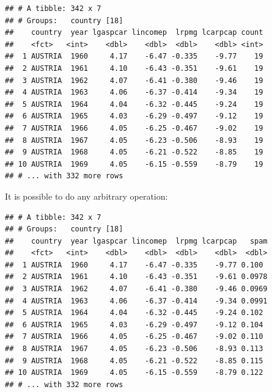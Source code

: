 \documentclass[]{gitbook}
\newenvironment{Shaded}{\begin{snugshade}}{\end{snugshade}}
\newcommand{\DataTypeTok}[1]{\textcolor[rgb]{0.13,0.29,0.53}{#1}}
\newcommand{\KeywordTok}[1]{\textcolor[rgb]{0.13,0.29,0.53}{\textbf{#1}}}
\newcommand{\NormalTok}[1]{#1}
\newcommand{\OperatorTok}[1]{\textcolor[rgb]{0.81,0.36,0.00}{\textbf{#1}}}
\newcommand{\StringTok}[1]{\textcolor[rgb]{0.31,0.60,0.02}{#1}}
\begin{document}
\begin{Shaded}
\end{Shaded}

\begin{verbatim}
## # A tibble: 342 x 7
## # Groups:   country [18]
##    country  year lgaspcar lincomep  lrpmg lcarpcap count
##    <fct>   <int>    <dbl>    <dbl>  <dbl>    <dbl> <int>
##  1 AUSTRIA  1960     4.17    -6.47 -0.335    -9.77    19
##  2 AUSTRIA  1961     4.10    -6.43 -0.351    -9.61    19
##  3 AUSTRIA  1962     4.07    -6.41 -0.380    -9.46    19
##  4 AUSTRIA  1963     4.06    -6.37 -0.414    -9.34    19
##  5 AUSTRIA  1964     4.04    -6.32 -0.445    -9.24    19
##  6 AUSTRIA  1965     4.03    -6.29 -0.497    -9.12    19
##  7 AUSTRIA  1966     4.05    -6.25 -0.467    -9.02    19
##  8 AUSTRIA  1967     4.05    -6.23 -0.506    -8.93    19
##  9 AUSTRIA  1968     4.05    -6.21 -0.522    -8.85    19
## 10 AUSTRIA  1969     4.05    -6.15 -0.559    -8.79    19
## # ... with 332 more rows
\end{verbatim}

It is possible to do any arbitrary operation:

\begin{Shaded}
\end{Shaded}

\begin{verbatim}
## # A tibble: 342 x 7
## # Groups:   country [18]
##    country  year lgaspcar lincomep  lrpmg lcarpcap   spam
##    <fct>   <int>    <dbl>    <dbl>  <dbl>    <dbl>  <dbl>
##  1 AUSTRIA  1960     4.17    -6.47 -0.335    -9.77 0.100 
##  2 AUSTRIA  1961     4.10    -6.43 -0.351    -9.61 0.0978
##  3 AUSTRIA  1962     4.07    -6.41 -0.380    -9.46 0.0969
##  4 AUSTRIA  1963     4.06    -6.37 -0.414    -9.34 0.0991
##  5 AUSTRIA  1964     4.04    -6.32 -0.445    -9.24 0.102 
##  6 AUSTRIA  1965     4.03    -6.29 -0.497    -9.12 0.104 
##  7 AUSTRIA  1966     4.05    -6.25 -0.467    -9.02 0.110 
##  8 AUSTRIA  1967     4.05    -6.23 -0.506    -8.93 0.113 
##  9 AUSTRIA  1968     4.05    -6.21 -0.522    -8.85 0.115 
## 10 AUSTRIA  1969     4.05    -6.15 -0.559    -8.79 0.122 
## # ... with 332 more rows
\end{verbatim}
\end{document}
